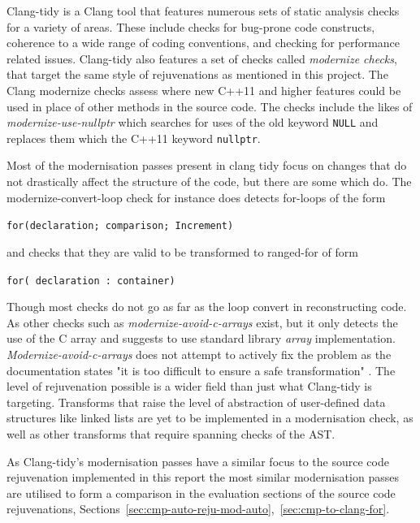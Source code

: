 \documentclass[bsc,frontabs,singlespacing,twoside,parskip,deptreport]{infthesis}
\begin{document}
Clang-tidy \cite{CLANG_TIDY} is a Clang tool that features numerous sets of static analysis checks for a variety of areas. These include checks for bug-prone code constructs, coherence to a wide range of coding conventions, and checking for performance related issues. Clang-tidy also features a set of checks called \textit{modernize checks}, that target the same style of rejuvenations as mentioned in this project. The Clang modernize checks assess where new C++11 and higher features could be used in place of other methods in the source code. The checks include the likes of \textit{modernize-use-nullptr} which searches for uses of the old keyword \texttt{NULL} and replaces them which the C++11 keyword \texttt{nullptr}.

Most of the modernisation passes present in clang tidy focus on changes that do not drastically affect the structure of the code, but there are some which do. The modernize-convert-loop check \cite{FOR_CONVERT} for instance does detects for-loops of the form

\begin{center}
\texttt{for(declaration; comparison; Increment)}    
\end{center}

and checks that they are valid to be transformed to ranged-for of form

\begin{center}
\texttt{for( declaration : container)} 
\end{center}

Though most checks do not go as far as the loop convert in reconstructing code. As other checks such as \textit{modernize-avoid-c-arrays} \cite{ARRAY_CONVERT} exist, but it only detects the use of the C array and suggests to use standard library \textit{array} implementation. \textit{Modernize-avoid-c-arrays} does not attempt to actively fix the problem as the documentation states "it is too difficult to ensure a safe transformation" \cite{ARRAY_CONVERT}. The level of rejuvenation possible is a wider field than just what Clang-tidy is targeting. Transforms that raise the level of abstraction of user-defined data structures like linked lists are yet to be implemented in a modernisation check, as well as other transforms that require spanning checks of the AST.

As Clang-tidy's modernisation passes have a similar focus to the source code rejuvenation implemented in this report the most similar modernisation passes are utilised to form a comparison in the evaluation sections of the source code rejuvenations, Sections~\ref{sec:cmp-auto-reju-mod-auto},~\ref{sec:cmp-to-clang-for}.   
\end{document}
